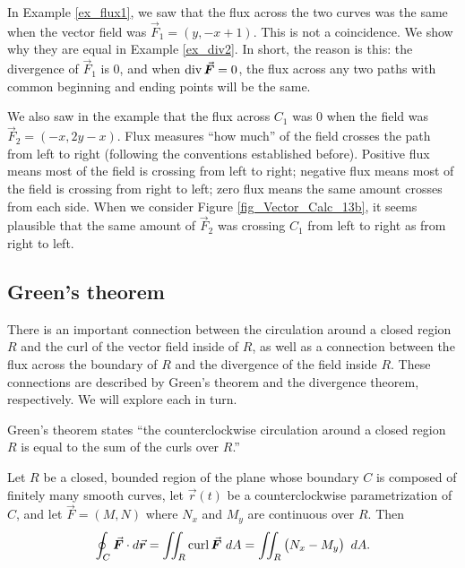 In Example \ref{ex_flux1}, we saw that the flux across the two curves was the same when the vector field was $\vec F_1 = \left( y, -x+1\right)$. This is not a coincidence. We show why they are equal in Example \ref{ex_div2}. In short, the reason is this: the divergence of $\vec F_1$ is 0, and when $\divv \vec F = 0$, the flux across any two paths with common beginning and ending points will be the same.

We also saw in the example that the flux across $C_1$ was 0 when the field was $\vec F_2 = \left( -x, 2y-x\right)$. Flux measures ``how much'' of the field crosses the path from left to right (following the conventions established before). Positive flux means most of the field is crossing from left to right; negative flux means most of the field is crossing from right to left; zero flux means the same amount crosses from each side. When we consider Figure \ref{fig_Vector_Calc_13b}, it seems plausible that the same amount of $\vec F_2$ was crossing $C_1$ from left to right as from right to left.




\subsection{Green's theorem}

	\checkoddpage
{}
There is an important connection between the circulation around a closed region $R$ and the curl of the vector field inside of $R$, as well as a connection between the flux across the boundary of $R$ and the divergence of the field inside $R$. These connections are described by Green's theorem and the divergence theorem, respectively. We will explore each in turn.

Green's theorem states ``the counterclockwise circulation around a closed region $R$ is equal to the sum of the curls over $R$.''

\pagebreak
\begin{theorem}
\label{thm:greens}
Let $R$ be a closed, bounded region of the plane whose boundary $C$ is composed of finitely many smooth curves, let $\vec r(t)$ be a counterclockwise parametrization of $C$, and let $\vec F =\left( M,N\right)$ where $N_x$ and $M_y$ are continuous over $R$. Then
$$\oint_C \vec F\cdot d\vec r = \iint_R\curl \vec F\ dA= \iint_R\left(N_x-M_y\right) \ dA.$$
\end{theorem}

